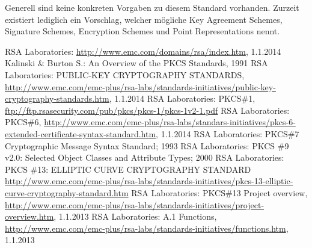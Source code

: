 \documentclass[10pt,a4paper]{article}
\begin{document}
Generell sind keine konkreten Vorgaben zu diesem Standard vorhanden. Zurzeit existiert
lediglich ein Vorschlag, welcher mögliche Key Agreement Schemes, Signature Schemes,
Encryption Schemes und Point Representations nennt.

\FloatBarrier
\appendix
\renewcommand{\refname}{\section{Quellen}}
\begin{thebibliography}{}
     RSA Laboratories:
        \url{http://www.emc.com/domains/rsa/index.htm}, 1.1.2014
     Kalinski \& Burton S.: An Overview of the PKCS Standards, 1991
     RSA Laboratories: PUBLIC-KEY CRYPTOGRAPHY
        STANDARDS,
        \url{http://www.emc.com/emc-plus/rsa-labs/standards-initiatives/public-key-cryptography-standards.htm},
        1.1.2014
     RSA Laboratories: PKCS\#1,
        \url{ftp://ftp.rsasecurity.com/pub/pkcs/pkcs-1/pkcs-1v2-1.pdf}
     RSA Laboratories: PKCS\#6,
        \url{http://www.emc.com/emc-plus/rsa-labs/standars-initiatives/pkcs-6-extended-certificate-syntax-standard.htm},
        1.1.2014
     RSA Laboratories: PKCS\#7 Cryptographic Message Syntax Standard;
        1993
     RSA Laboratories: PKCS \#9 v2.0: Selected Object Classes and
        Attribute Types; 2000
     RSA Laboratories: PKCS \#13: ELLIPTIC CURVE CRYPTOGRAPHY
        STANDARD
        \url{http://www.emc.com/emc-plus/rsa-labs/standards-initiatives/pkcs-13-elliptic-curve-cryptography-standard.htm}
     RSA Laboratories: PKCS\#13 Project overview,
        \url{http://www.emc.com/emc-plus/rsa-labs/standards-initiatives/project-overview.htm},
        1.1.2013
     RSA Laboratories: A.1 Functions,
        \url{http://www.emc.com/emc-plus/rsa-labs/standards-initiatives/functions.htm},
        1.1.2013
\end{thebibliography}
\end{document}

